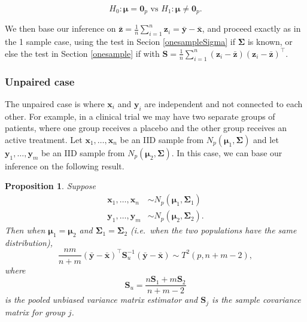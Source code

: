 \documentclass[
]{book}
\newtheorem{proposition}{Proposition}[chapter]
\theoremstyle{definition}
\theoremstyle{definition}
\theoremstyle{definition}
\theoremstyle{definition}
\theoremstyle{remark}
\begin{document}
\[H_0: {\boldsymbol{\mu}}={\mathbf 0}_p \mbox{ vs } H_1: {\boldsymbol{\mu}}\neq {\mathbf 0}_p.\]

We then base our inference on \(\bar{\mathbf z} = \frac{1}{n} \sum_{i=1}^n \mathbf z_i = \bar{\mathbf y} - \bar{\mathbf x}\), and proceed exactly as in the 1 sample case, using the test in Secion \ref{onesampleSigma} if \(\boldsymbol{\Sigma}\) is known, or else the test in Section \ref{onesample} if with \(\mathbf S= \frac{1}{n} \sum_{i=1}^n (\mathbf z_i - \bar{\mathbf z})(\mathbf z_i - \bar{\mathbf z})^\top\).

\hypertarget{unpaired-case}{%
\subsubsection*{Unpaired case}\label{unpaired-case}}

The unpaired case is where \(\mathbf x_i\) and \(\mathbf y_i\) are independent and not connected to each other. For example, in a clinical trial we may have two separate groups of patients, where one group receives a placebo and the other group receives an active treatment. Let \(\mathbf x_1,\ldots,\mathbf x_n\) be an IID sample from \(N_p({\boldsymbol{\mu}}_1,\boldsymbol{\Sigma})\) and let \(\mathbf y_1,\ldots,\mathbf y_m\) be an IID sample from \(N_p({\boldsymbol{\mu}}_2,\boldsymbol{\Sigma})\). In this case, we can base our inference on the following result.

\begin{proposition}
\protect\hypertarget{prp:seven1}{}{\label{prp:seven1} }Suppose
\begin{align*}
\mathbf x_1,\ldots,\mathbf x_n  &\sim N_p({\boldsymbol{\mu}}_1,\boldsymbol{\Sigma}_1)\\ 
\mathbf y_1,\ldots,\mathbf y_m  &\sim N_p({\boldsymbol{\mu}}_2,\boldsymbol{\Sigma}_2). 
\end{align*}
Then when \({\boldsymbol{\mu}}_1 = {\boldsymbol{\mu}}_2\) and \(\boldsymbol{\Sigma}_1 = \boldsymbol{\Sigma}_2\) (i.e.~when the two populations have the same distribution),
\[\frac{nm}{n+m} (\bar{\mathbf y} - \bar{\mathbf x})^\top \mathbf S_u^{-1} (\bar{\mathbf y} - \bar{\mathbf x}) \sim T^2(p,n+m-2),\]
where
\[\mathbf S_u = \frac{n\mathbf S_1 + m\mathbf S_2}{n+m-2}\]
is the pooled unbiased variance matrix estimator
and \(\mathbf S_j\) is the sample covariance matrix for group \(j\).
\end{proposition}
\end{document}
